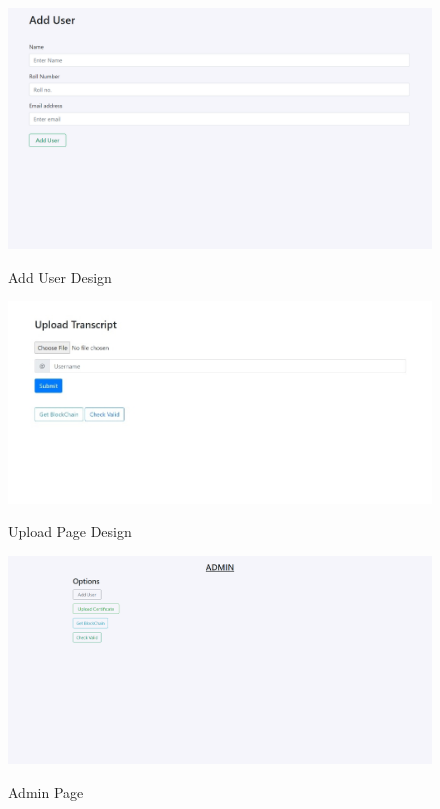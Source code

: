 \begin{figure}[H]
    \centering
    \includegraphics[scale=0.4]{images/add_user.png}\\[0.5cm]
    \caption{Add User Design}
    \label{fig:my_label}
\end{figure}

\begin{figure}[H]
    \centering
    \includegraphics[scale=0.47]{images/upload_page.jpeg}\\[0.5cm]
    \caption{Upload Page Design}
    \label{fig:my_label}
\end{figure}

\begin{figure}[H]
    \centering
    \includegraphics[scale=0.32]{images/Admin Page.png}\\[0.5cm]
    \caption{Admin Page}
    \label{fig:Admin Page}
\end{figure}

